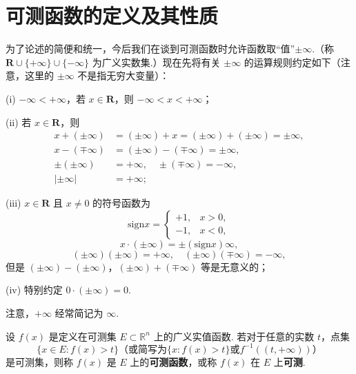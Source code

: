 \documentclass[../../main.tex]{subfiles}
\begin{document}
\section{可测函数的定义及其性质}

为了论述的简便和统一，今后我们在谈到可测函数时允许函数取“值”\(\pm\infty\).（称 \(\mathbf{R}\cup\{+\infty\}\cup\{-\infty\}\) 为广义实数集.）现在先将有关 \(\pm\infty\) 的运算规则约定如下（注意，这里的 \(\pm\infty\) 不是指无穷大变量）：

(i) \(-\infty < +\infty\)，若 \(x \in \mathbf{R}\)，则 \(-\infty < x < +\infty\)；

(ii) 若 \(x \in \mathbf{R}\)，则
\begin{align*}
x + (\pm\infty) &= (\pm\infty) + x = (\pm\infty) + (\pm\infty) = \pm\infty,\\
x - (\mp\infty) &= (\pm\infty) - (\mp\infty) = \pm\infty,\\
\pm(\pm\infty) &= +\infty, \quad \pm(\mp\infty) = -\infty,\\
|\pm\infty| &= +\infty;
\end{align*}

(iii) \(x \in \mathbf{R}\) 且 \(x \neq 0\) 的符号函数为
\[
\mathrm{sign}x = 
\begin{cases}
+1, & x > 0,\\
-1, & x < 0,
\end{cases}
\]
\[
x\cdot(\pm\infty) = \pm(\mathrm{sign}x)\infty,
\]
\[
(\pm\infty)(\pm\infty) = +\infty, \quad (\pm\infty)(\mp\infty) = -\infty,
\]
但是 \((\pm\infty) - (\pm\infty)\)，\((\pm\infty) + (\mp\infty)\) 等是无意义的；

(iv) 特别约定 \(0\cdot(\pm\infty) = 0\).

注意，\(+\infty\) 经常简记为 \(\infty\). 

\begin{definition}[可测函数]
设 \(f(x)\) 是定义在可测集 \(E \subset \mathbb{R}^n\) 上的广义实值函数. 若对于任意的实数 \(t\)，点集
\[
\{x \in E: f(x) > t\} \text{（或简写为} \{x: f(x) > t\} \text{或}f^{-1}((t,+\infty))\text{）}
\]
是可测集，则称 \(f(x)\) 是 \(E\) 上的\textbf{可测函数}，或称 \(f(x)\) 在 \(E\) 上\textbf{可测}. 
\end{definition}
\end{document}
